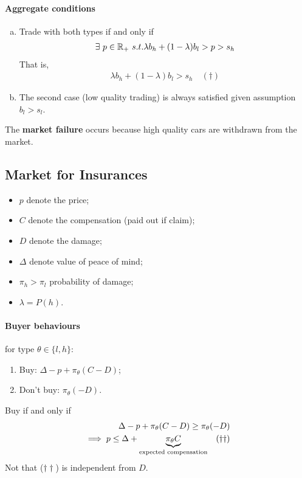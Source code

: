 \documentclass{article}
\begin{document}
   	\paragraph{Aggregate conditions}
   	\begin{enumerate}[(a)]
   		\item Trade with both types if and only if
   		\begin{align}
   			\exists\ p\in \mathbb{R}_+\ s.t. \lambda b_h + (1 - \lambda) b_l > p > s_h
   		\end{align}
   		That is, 
   		\begin{align}
   			\lambda b_h + (1 - \lambda) b_l > s_h\quad (\dagger)
   		\end{align}
   		\item The second case (low quality trading) is always satisfied given assumption $b_l > s_l$.
   	\end{enumerate}
   	The \textbf{market failure} occurs because high quality cars are withdrawn from the market.
   	\subsection{Market for Insurances}
   	\begin{itemize}
   		\item $p$ denote the price;
   		\item $C$ denote the compensation (paid out if claim);
   		\item $D$ denote the damage;
   		\item $\Delta$ denote value of peace of mind;
   		\item $\pi_h > \pi_l$ probability of damage;
   		\item $\lambda = P(h)$.
   	\end{itemize}
   	
   	\paragraph{Buyer behaviours} for type $\theta \in \{l, h\}$:
   	\begin{enumerate}
   		\item Buy: $\Delta - p + \pi_\theta (C - D)$;
   		\item Don't buy: $\pi_\theta(-D)$.
   	\end{enumerate}
   	Buy if and only if
   	\begin{align}
   		\Delta - p + \pi_\theta (C - D) \geq \pi_\theta(-D) \\
   		\implies p \leq \Delta + \underbrace{\pi_\theta C}_{\text{{expected compensation}}}\quad (\dagger\dagger)
   	\end{align}
   	Not that ($\dagger\dagger$) is independent from $D$.
	
\end{document}
